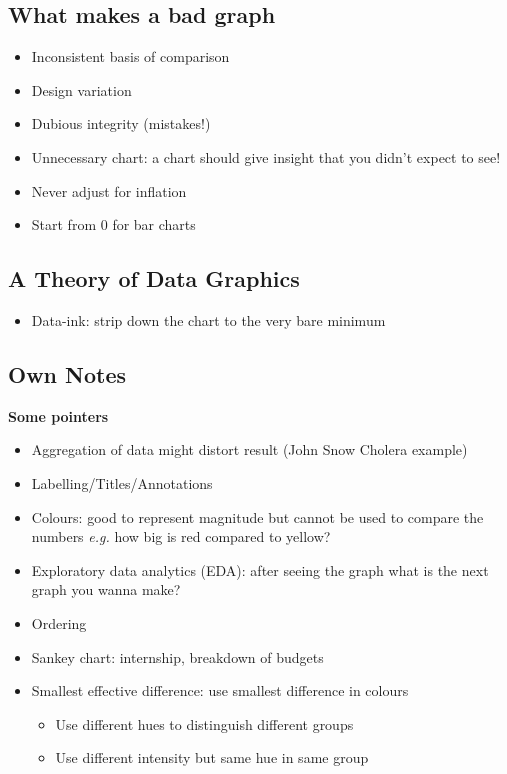\documentclass{article}
\newcommand{\eg}[0]{\textit{e.g. }}
\begin{document}
\begin{multicols}{2}
\subsection{What makes a bad graph}
\begin{itemize}
	\item Inconsistent basis of comparison
	\item Design variation
	\item Dubious integrity (mistakes!)
	\item Unnecessary chart: a chart should give insight that you didn't expect to see!
	\item Never adjust for inflation
	\item Start from 0 for bar charts
\end{itemize}
\subsection{A Theory of Data Graphics}
\begin{itemize}
	\item Data-ink: strip down the chart to the very bare minimum
\end{itemize}
\subsection{Own Notes}
\textbf{Some pointers}
\begin{itemize}
	\item Aggregation of data might distort result (John Snow Cholera example)
	\item Labelling/Titles/Annotations
	\item Colours: good to represent magnitude but cannot be used to compare the numbers \eg how big is red compared to yellow?
	\item Exploratory data analytics (EDA): after seeing the graph what is the next graph you wanna make?
	\item Ordering
	\item Sankey chart: internship, breakdown of budgets
	\item Smallest effective difference: use smallest difference in colours
	\begin{itemize}
		\item Use different hues to distinguish different groups
		\item Use different intensity but same hue in same group
	\end{itemize}
\end{itemize}


\end{multicols}
\end{document}
